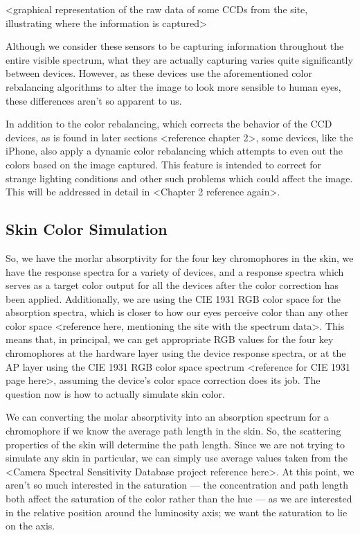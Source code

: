 <graphical representation of the raw data of some CCDs from the site, illustrating where the information is captured>

Although we consider these sensors to be capturing information throughout the entire visible spectrum, what they are actually capturing varies quite significantly between devices. However, as these devices use the aforementioned color rebalancing algorithms to alter the image to look more sensible to human eyes, these differences aren't so apparent to us.

In addition to the color rebalancing, which corrects the behavior of the CCD devices, as is found in later sections <reference chapter 2>, some devices, like the iPhone, also apply a dynamic color rebalancing which attempts to even out the colors based on the image captured. This feature is intended to correct for strange lighting conditions and other such problems which could affect the image. This will be addressed in detail in <Chapter 2 reference again>.


\subsection{Skin Color Simulation}

So, we have the morlar absorptivity for the four key chromophores in the skin, we have the response spectra for a variety of devices, and a response spectra which serves as a target color output for all the devices after the color correction has been applied. Additionally, we are using the CIE 1931 RGB color space for the absorption spectra, which is closer to how our eyes perceive color than any other color space <reference here, mentioning the site with the spectrum data>. This means that, in principal, we can get appropriate RGB values for the four key chromophores at the hardware layer using the device response spectra, or at the AP layer using the CIE 1931 RGB color space spectrum <reference for CIE 1931 page here>, assuming the device's color space correction does its job. The question now is how to actually simulate skin color.

We can converting the molar absorptivity into an absorption spectrum for a chromophore if we know the average path length in the skin. So, the scattering properties of the skin will determine the path length. Since we are not trying to simulate any skin in particular, we can simply use average values taken from the <Camera Spectral Sensitivity Database project reference here>. At this point, we aren't so much interested in the saturation --- the concentration and path length both affect the saturation of the color rather than the hue --- as we are interested in the relative position around the luminosity axis; we want the saturation to lie on the axis.

